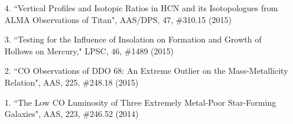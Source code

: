 \documentclass[margin, 10pt]{res} %
\begin{document}
\begin{resume}
\begin{enumerate}
\item[4.] ``Vertical Profiles and Isotopic Ratios in HCN and its Isotopologues from ALMA Observations of Titan", AAS/DPS, 47, \#310.15 (2015)
\item[3.] ``Testing for the Influence of Insolation on Formation and Growth of Hollows on Mercury," LPSC, 46, \#1489 (2015)
\item[2.] ``CO Observations of DDO 68: An Extreme Outlier on the Mass-Metallicity Relation", AAS, 225, \#248.18 (2015)
\item[1.] ``The Low CO Luminosity of Three Extremely Metal-Poor Star-Forming Galaxies", AAS, 223, \#246.52 (2014)

\end{enumerate}



%





\end{resume}
\end{document}
